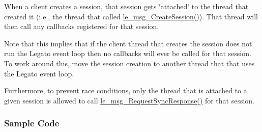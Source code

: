 When a client creates a session, that session gets \char`\"{}attached\char`\"{} to the thread that created it (i.\+e., the thread that called \hyperlink{le__messaging_8h_a696d7c2d4e3725d3ddb5dd2d79d2d732}{le\+\_\+msg\+\_\+\+Create\+Session()}). That thread will then call any callbacks registered for that session.

Note that this implies that if the client thread that creates the session does not run the Legato event loop then no callbacks will ever be called for that session. To work around this, move the session creation to another thread that that uses the Legato event loop.

Furthermore, to prevent race conditions, only the thread that is attached to a given session is allowed to call \hyperlink{le__messaging_8h_aa3cf113b26b154697ccef270dafe8798}{le\+\_\+msg\+\_\+\+Request\+Sync\+Response()} for that session.\hypertarget{c_messaging_c_messagingClientExample}{}\subsubsection{Sample Code}\label{c_messaging_c_messagingClientExample}

